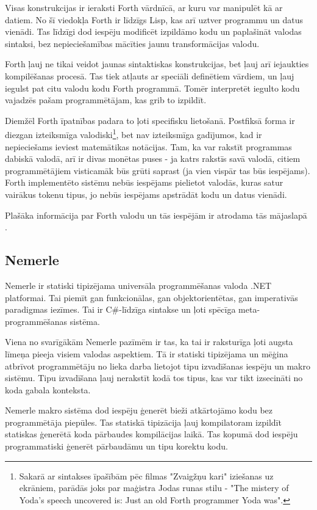 Visas konstrukcijas ir ieraksti Forth vārdnīcā, ar kuru var manipulēt kā ar datiem. No šī viedokļa Forth ir līdzīgs Lisp, kas arī uztver programmu un datus vienādi. Tas līdzīgi dod iespēju modificēt izpildāmo kodu un paplašināt valodas sintaksi, bez nepieciešamības mācīties jaunu transformācijas valodu.

Forth ļauj ne tikai veidot jaunas sintaktiskas konstrukcijas, bet ļauj arī iejaukties kompilēšanas procesā. Tas tiek atļauts ar speciāli definētiem vārdiem, un ļauj iegulst pat citu valodu kodu Forth programmā. Tomēr interpretēt iegulto kodu vajadzēs pašam programmētājam, kas grib to izpildīt.

Diemžēl Forth īpatnības padara to ļoti specifisku lietošanā. Postfiksā forma ir diezgan izteiksmīga valodiski\footnote{Sakarā ar sintakses īpašībām pēc filmas "Zvaigžņu kari" iziešanas uz ekrāniem, parādās joks par maģistra Jodas runas stilu - "The mistery of Yoda’s speech uncovered is: Just an old Forth programmer Yoda was".}, bet nav izteiksmīga gadījumos, kad ir nepieciešams ieviest matemātikas notācijas. Tam, ka var rakstīt programmas dabiskā valodā, arī ir divas monētas puses - ja katrs rakstīs savā valodā, citiem programmētājiem visticamāk būs grūti saprast (ja vien vispār tas būs iespējams). Forth implementēto sistēmu nebūs iespējams pielietot valodās, kuras satur vairākus tokenu tipus, jo nebūs iespējams apstrādāt kodu un datus vienādi.

Plašāka informācija par Forth valodu un tās iespējām ir atrodama tās mājaslapā \cite{ForthHome}.

\subsection{\label{sbs:rel_nemerle}Nemerle}

Nemerle ir statiski tipizējama universāla programmēšanas valoda .NET platformai. Tai piemīt gan funkcionālas, gan objektorientētas, gan imperativās paradigmas iezīmes. Tai ir C\#-līdzīga sintakse un ļoti spēcīga meta-programmēšanas sistēma.

Viena no svarīgākām Nemerle pazīmēm ir tas, ka tai ir raksturīga ļoti augsta līmeņa pieeja visiem valodas aspektiem. Tā ir statiski tipizējama un mēģina atbrīvot programmētāju no lieka darba lietojot tipu izvadīšanas iespēju un makro sistēmu. Tipu izvadīšana ļauj nerakstīt kodā tos tipus, kas var tikt izsecināti no koda gabala konteksta.

Nemerle makro sistēma dod iespēju ģenerēt bieži atkārtojāmo kodu bez programmētāja piepūles. Tas statiskā tipizācija ļauj kompilatoram izpildīt statiskas ģenerētā koda pārbaudes kompilācijas laikā. Tas kopumā dod iespēju programmatiski ģenerēt pārbaudāmu un tipu korektu kodu.

